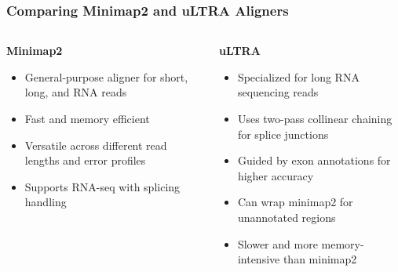 \documentclass[aspectratio=169]{beamer}
\begin{document}
\begin{frame}
  \frametitle{Comparing Minimap2 and uLTRA Aligners}
  \begin{columns}[T]
    \begin{column}{0.48\textwidth}
      \textbf{Minimap2}
      \begin{itemize}
        \item General-purpose aligner for short, long, and RNA reads
        \item Fast and memory efficient
        \item Versatile across different read lengths and error profiles
        \item Supports RNA-seq with splicing handling
      \end{itemize}
    \end{column}
    \begin{column}{0.48\textwidth}
      \textbf{uLTRA}
      \begin{itemize}
        \item Specialized for long RNA sequencing reads
        \item Uses two-pass collinear chaining for splice junctions
        \item Guided by exon annotations for higher accuracy
        \item Can wrap minimap2 for unannotated regions
        \item Slower and more memory-intensive than minimap2
      \end{itemize}
    \end{column}
  \end{columns}
\end{frame}
\end{document}
